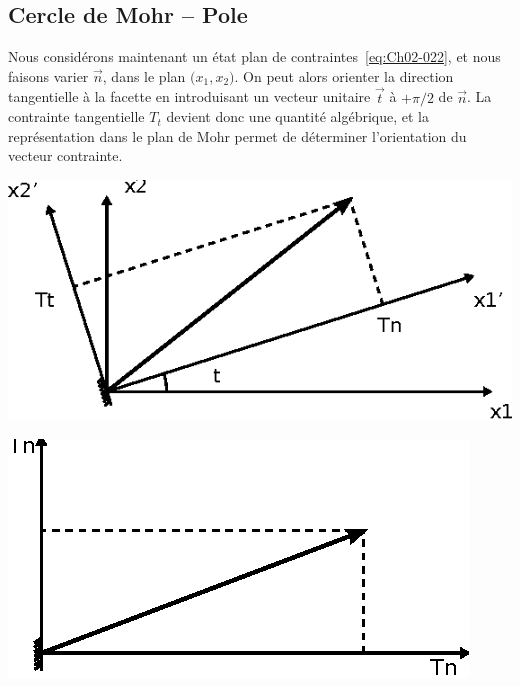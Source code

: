\subsection{Cercle de Mohr -- Pole} \label{ssec:Ch02-3.2}
Nous considérons maintenant un état plan de contraintes~\eqref{eq:Ch02-022}, et nous faisons varier $\vec{n}$, dans le plan $\bigl( x_1,x_2 \bigr)$.
On peut alors orienter la direction tangentielle à la facette en introduisant un vecteur unitaire $\vec{t}$ à $+\pi/2$ de $\vec{n}$.
La contrainte tangentielle $T_t$ devient donc une quantité algébrique, et la représentation dans le plan de Mohr permet de déterminer l'orientation du vecteur contrainte. 
\begin{multicols}{2}
    \begin{center}
        \includegraphics{../images/T1_Ch02-0016a}
    \end{center}
    \columnbreak
    \begin{center}
        \includegraphics{../images/T1_Ch02-0016b}
    \end{center}
\end{multicols}
